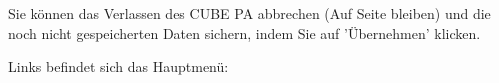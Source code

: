 \vspace{\baselineskip}

Sie können das Verlassen des CUBE PA abbrechen (Auf Seite bleiben) und die noch nicht gespeicherten Daten sichern, indem Sie auf 'Übernehmen' klicken.

\vspace{\baselineskip}

\pagebreak

Links befindet sich das Hauptmenü:

\vspace{\baselineskip}

\begin{figure}   %
  \vspace{-35pt}      %
  \begin{center}

\end{center}
\end{figure}
